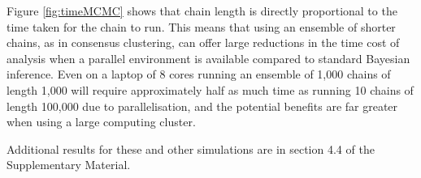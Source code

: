 \documentclass{bmcart}
\begin{document}
Figure \ref{fig:timeMCMC} shows that chain length is directly proportional to the time taken for the chain to run. This means that using an ensemble of shorter chains, as in consensus clustering, can offer large reductions in the time cost of analysis when a parallel environment is available compared to standard Bayesian inference. Even on a laptop of 8 cores running an ensemble of 1,000 chains of length 1,000 will require approximately half as much time as running 10 chains of length 100,000 due to parallelisation, and the potential benefits are far greater when using a large computing cluster.

Additional results for these and other simulations are in section 4.4 of the Supplementary Material. %



%
%
\end{document}

